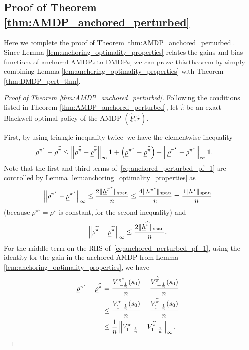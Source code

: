 \documentclass{article}
\theoremstyle{plain}
\theoremstyle{plain}
\theoremstyle{remark}
\theoremstyle{plain}
\theoremstyle{plain}
\newcommand{\Phat}{\widehat{P}}
\newcommand{\pistar}{\pi^\star}
\newcommand{\one}{\mathbf{1}}
\newcommand{\pihat}{\widehat{\pi}}
\newcommand{\Phatanc}{\underline{\Phat}}
\newcommand{\rhoanc}{\underline{\rho}}
\newcommand{\hanc}{\underline{h}}
\begin{document}
\subsection{Proof of Theorem \ref{thm:AMDP_anchored_perturbed}}
\label{sec:AMDP_anch_pert_pf}
Here we complete the proof of Theorem \ref{thm:AMDP_anchored_perturbed}. Since Lemma \ref{lem:anchoring_optimality_properties} relates the gains and bias functions of anchored AMDPs to DMDPs, we can prove this theorem by simply combining Lemma \ref{lem:anchoring_optimality_properties} with Theorem \ref{thm:DMDP_pert_thm}.

\begin{proof}[Proof of Theorem \ref{thm:AMDP_anchored_perturbed}]
Following the conditions listed in Theorem \ref{thm:AMDP_anchored_perturbed}, let $\pihat$ be an exact Blackwell-optimal policy of the AMDP $(\Phatanc, \widetilde{r})$.

    First, by using triangle inequality twice, we have the elementwise inequality
    \begin{align}
        \rho^{\pistar} - \rho^{\pihat}  & \leq \infnorm{\rho^{\pihat} - \rhoanc^{\pihat}}\one + \left(\rhoanc^{\pistar} - \rhoanc^{\pihat} \right) + \infnorm{\rhoanc^{\pistar} - \rho^{\pistar}} \one. \label{eq:anchored_perturbed_pf_1}
    \end{align}
    Note that the first and third terms of~\eqref{eq:anchored_perturbed_pf_1} are controlled by Lemma \ref{lem:anchoring_optimality_properties} as
    \begin{align}
        \infnorm{\rho^{\pistar} - \rhoanc^{\pistar}}  \leq \frac{2\spannorm{\hanc^{\pistar}}}{n} \leq \frac{4\spannorm{h^{\pistar}}}{n} = \frac{4\spannorm{h^\star}}{n}\label{eq:anchored_perturbed_pf_2}
    \end{align}
    (because $\rho^{\pistar} = \rho^\star$ is constant, for the second inequality)
    and
    \begin{align}
        \infnorm{\rho^{\pihat} - \rhoanc^{\pihat}}  \leq \frac{2\spannorm{\hanc^{\pihat}}}{n}.  \label{eq:anchored_perturbed_pf_3}
    \end{align}
    For the middle term on the RHS of~\eqref{eq:anchored_perturbed_pf_1}, using the identity for the gain in the anchored AMDP from Lemma \ref{lem:anchoring_optimality_properties}, we have
    \begin{align}
        \rhoanc^{\pistar} - \rhoanc^{\pihat} &=  \frac{V^{\pistar}_{1-\frac{1}{n}}(s_0)}{n} - \frac{V^{\pihat}_{1-\frac{1}{n}}(s_0)}{n} \nonumber \\
        & \leq \frac{V^{\star}_{1-\frac{1}{n}}(s_0)}{n} - \frac{V^{\pihat}_{1-\frac{1}{n}}(s_0)}{n} \nonumber\\
        & \leq \frac{1}{n} \infnorm{V^{\star}_{1-\frac{1}{n}} - V^{\pihat}_{1-\frac{1}{n}}}. \label{eq:anchored_perturbed_pf_4}
    \end{align}


\end{proof}
\end{document}
